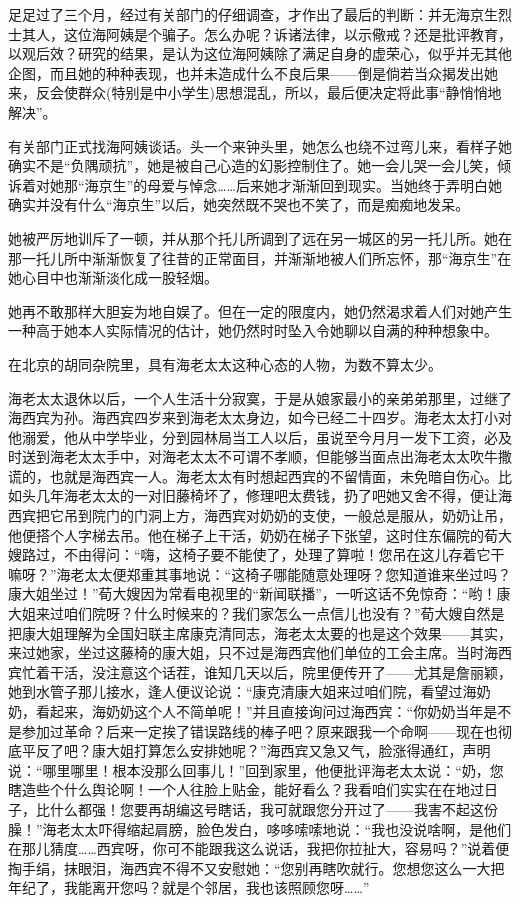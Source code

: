\par 足足过了三个月，经过有关部门的仔细调查，才作出了最后的判断：并无海京生烈士其人，这位海阿姨是个骗子。怎么办呢？诉诸法律，以示儆戒？还是批评教育，以观后效？研究的结果，是认为这位海阿姨除了满足自身的虚荣心，似乎并无其他企图，而且她的种种表现，也并未造成什么不良后果——倒是倘若当众揭发出她来，反会使群众(特别是中小学生)思想混乱，所以，最后便决定将此事“静悄悄地解决”。
\par 有关部门正式找海阿姨谈话。头一个来钟头里，她怎么也绕不过弯儿来，看样子她确实不是“负隅顽抗”，她是被自己心造的幻影控制住了。她一会儿哭一会儿笑，倾诉着对她那“海京生”的母爱与悼念……后来她才渐渐回到现实。当她终于弄明白她确实并没有什么“海京生”以后，她突然既不哭也不笑了，而是痴痴地发呆。
\par 她被严厉地训斥了一顿，并从那个托儿所调到了远在另一城区的另一托儿所。她在那一托儿所中渐渐恢复了往昔的正常面目，并渐渐地被人们所忘怀，那“海京生”在她心目中也渐渐淡化成一股轻烟。
\par 她再不敢那样大胆妄为地自娱了。但在一定的限度内，她仍然渴求着人们对她产生一种高于她本人实际情况的估计，她仍然时时坠入令她聊以自满的种种想象中。
\par 在北京的胡同杂院里，具有海老太太这种心态的人物，为数不算太少。
\par 海老太太退休以后，一个人生活十分寂寞，于是从娘家最小的亲弟弟那里，过继了海西宾为孙。海西宾四岁来到海老太太身边，如今已经二十四岁。海老太太打小对他溺爱，他从中学毕业，分到园林局当工人以后，虽说至今月月一发下工资，必及时送到海老太太手中，对海老太太不可谓不孝顺，但能够当面点出海老太太吹牛撒谎的，也就是海西宾一人。海老太太有时想起西宾的不留情面，未免暗自伤心。比如头几年海老太太的一对旧藤椅坏了，修理吧太费钱，扔了吧她又舍不得，便让海西宾把它吊到院门的门洞上方，海西宾对奶奶的支使，一般总是服从，奶奶让吊，他便搭个人字梯去吊。他在梯子上干活，奶奶在梯子下张望，这时住东偏院的荀大嫂路过，不由得问：“嗨，这椅子要不能使了，处理了算啦！您吊在这儿存着它干嘛呀？”海老太太便郑重其事地说：“这椅子哪能随意处理呀？您知道谁来坐过吗？康大姐坐过！”荀大嫂因为常看电视里的“新闻联播”，一听这话不免惊奇：“哟！康大姐来过咱们院呀？什么时候来的？我们家怎么一点信儿也没有？”荀大嫂自然是把康大姐理解为全国妇联主席康克清同志，海老太太要的也是这个效果——其实，来过她家，坐过这藤椅的康大姐，只不过是海西宾他们单位的工会主席。当时海西宾忙着干活，没注意这个话茬，谁知几天以后，院里便传开了——尤其是詹丽颖，她到水管子那儿接水，逢人便议论说：“康克清康大姐来过咱们院，看望过海奶奶，看起来，海奶奶这个人不简单呢！”并且直接询问过海西宾：“你奶奶当年是不是参加过革命？后来一定挨了错误路线的棒子吧？原来跟我一个命啊——现在也彻底平反了吧？康大姐打算怎么安排她呢？”海西宾又急又气，脸涨得通红，声明说：“哪里哪里！根本没那么回事儿！”回到家里，他便批评海老太太说：“奶，您瞎造些个什么舆论啊！一个人往脸上贴金，能好看么？我看咱们实实在在地过日子，比什么都强！您要再胡编这号瞎话，我可就跟您分开过了——我害不起这份臊！”海老太太吓得缩起肩膀，脸色发白，哆哆嗦嗦地说：“我也没说啥啊，是他们在那儿猜度……西宾呀，你可不能跟我这么说话，我把你拉扯大，容易吗？”说着便掏手绢，抹眼泪，海西宾不得不又安慰她：“您别再瞎吹就行。您想您这么一大把年纪了，我能离开您吗？就是个邻居，我也该照顾您呀……”
